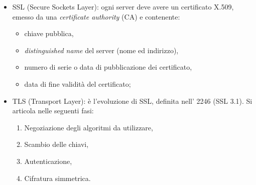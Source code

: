 \documentclass[a4paper,11pt]{article}
\def\vedi#1{\nameref{#1}}
\def\italic#1{\textit{#1}}
\begin{document}
\begin{itemize}
\item SSL (Secure Sockets Layer): ogni server deve avere un certificato X.509, emesso da una \italic{certificate authority} (CA) e contenente:
\begin{itemize}
\item chiave pubblica,
\item \italic{distinguished name} del server (nome ed indirizzo),
\item numero di serie o data di pubblicazione dei certificato,
\item data di fine validità del certificato;
\end{itemize}

\item TLS (Transport Layer): è l'evoluzione di SSL, definita nell'\vedi{RFC} 2246 (SSL 3.1). Si articola nelle seguenti fasi:
\begin{enumerate}
\item Negoziazione degli algoritmi da utilizzare,
\item Scambio delle chiavi,
\item Autenticazione,
\item Cifratura simmetrica.
\end{enumerate}
\end{itemize}
\end{document}
